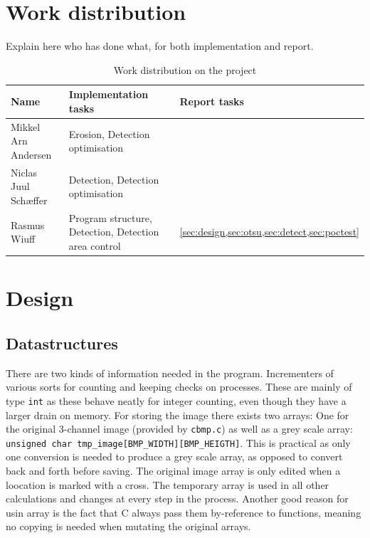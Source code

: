 \documentclass[a4paper, english]{article}
\numberwithin{equation}{section}
\begin{document}
\section{Work distribution}
Explain here who has done what, for both implementation and report.
\begin{table}[H]
    \centering
    \caption{Work distribution on the project}\label{tbl:ansvar}
    \begin{tabular}{lll}
        \toprule
        Name                 & Implementation tasks                                 & Report tasks                                      \\
        \midrule
        Mikkel Arn Andersen  & Erosion, Detection optimisation                      &                                                   \\
        Niclas Juul Schæffer & Detection, Detection optimisation                    &                                                   \\
        Rasmus Wiuff         & Program structure, Detection, Detection area control & \cref{sec:design,sec:otsu,sec:detect,sec:poctest} \\
        \bottomrule
    \end{tabular}
\end{table}
\section{Design}\label{sec:design}
\subsection{Datastructures}
There are two kinds of information needed in the program. Incrementers of various sorts for counting and keeping checks on processes. These are mainly of type \texttt{int} as these behave neatly for integer counting, even though they have a larger drain on memory. For storing the image there exists two arrays: One for the original 3-channel image (provided by \texttt{cbmp.c}) as well as a grey scale array: \texttt{unsigned char tmp\_image[BMP\_WIDTH][BMP\_HEIGTH]}.
This is practical as only one conversion is needed to produce a grey scale array, as opposed to convert back and forth before saving. The original image array is only edited when a loocation is marked with a cross. The temporary array is used in all other calculations and changes at every step in the process. Another good reason for usin array is the fact that C always pass them by-reference to functions, meaning no copying is needed when mutating the original arrays.
\end{document}
